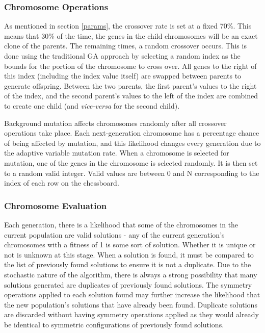 \documentclass{sig-alternate}
\begin{document}
\subsubsection{Chromosome Operations}
As mentioned in section \ref{params}, the crossover rate is set at a fixed 70\%. This means that 30\% of the time, the genes in the child chromosomes will be an exact clone of the parents. The remaining times, a random crossover occurs. This is done using the traditional GA approach by selecting a random index as the bounds for the portion of the chromosome to cross over. All genes to the right of this index (including the index value itself) are swapped between parents to generate offspring. Between the two parents, the first parent's values to the right of the index, and the second parent's values to the left of the index are combined to create one child (and \textit{vice-versa} for the second child).

Background mutation affects chromosomes randomly after all crossover operations take place. Each next-generation chromosome has a percentage chance of being affected by mutation, and this likelihood changes every generation due to the adaptive variable mutation rate. When a chromosome is selected for mutation, one of the genes in the chromosome is selected randomly. It is then set to a random valid integer. Valid values are between 0 and N corresponding to the index of each row on the chessboard.


\subsubsection{Chromosome Evaluation}
Each generation, there is a likelihood that some of the chromosomes in the current population are valid solutions - any of the current generation's chromosomes with a fitness of 1 is some sort of solution. Whether it is unique or not is unknown at this stage. When a solution is found, it must be compared to the list of previously found solutions to ensure it is not a duplicate. Due to the stochastic nature of the algorithm, there is always a strong possibility that many solutions generated are duplicates of previously found solutions. The symmetry operations applied to each solution found may further increase the likelihood that the new population's solutions that have already been found. Duplicate solutions are discarded without having symmetry operations applied as they would already be identical to symmetric configurations of previously found solutions.
\end{document}

